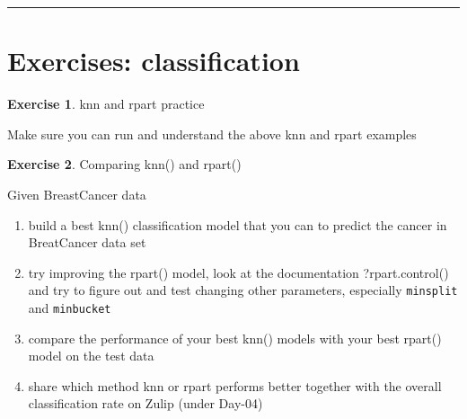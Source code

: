 \documentclass[
]{book}
\newenvironment{Shaded}{\begin{snugshade}}{\end{snugshade}}
\newcommand{\CommentTok}[1]{\textcolor[rgb]{0.56,0.35,0.01}{\textit{#1}}}
\newcommand{\DataTypeTok}[1]{\textcolor[rgb]{0.13,0.29,0.53}{#1}}
\newcommand{\FloatTok}[1]{\textcolor[rgb]{0.00,0.00,0.81}{#1}}
\newcommand{\KeywordTok}[1]{\textcolor[rgb]{0.13,0.29,0.53}{\textbf{#1}}}
\newcommand{\NormalTok}[1]{#1}
\newcommand{\OperatorTok}[1]{\textcolor[rgb]{0.81,0.36,0.00}{\textbf{#1}}}
\newcommand{\StringTok}[1]{\textcolor[rgb]{0.31,0.60,0.02}{#1}}
\providecommand{\tightlist}{%
  \setlength{\itemsep}{0pt}\setlength{\parskip}{0pt}}
\theoremstyle{definition}
\theoremstyle{definition}
\theoremstyle{definition}
\newtheorem{exercise}{Exercise}[chapter]
\theoremstyle{remark}
\begin{document}
\begin{Shaded}
\end{Shaded}

\begin{center}\rule{0.5\linewidth}{0.5pt}\end{center}

\hypertarget{exercises-classification}{%
\section{Exercises: classification}\label{exercises-classification}}

\begin{exercise}
\protect\hypertarget{exr:knn-rpart-repeat}{}{\label{exr:knn-rpart-repeat} }knn and rpart practice

Make sure you can run and understand the above knn and rpart examples
\end{exercise}

\begin{exercise}
\protect\hypertarget{exr:knn}{}{\label{exr:knn} }Comparing knn() and rpart()

Given BreastCancer data

\begin{enumerate}
\def\labelenumi{\alph{enumi})}
\tightlist
\item
  build a best knn() classification model that you can to predict the cancer in BreatCancer data set
\item
  try improving the rpart() model, look at the documentation ?rpart.control() and try to figure out and test changing other parameters, especially \texttt{minsplit} and \texttt{minbucket}
\item
  compare the performance of your best knn() models with your best rpart() model on the test data
\item
  share which method knn or rpart performs better together with the overall classification rate on Zulip (under Day-04)
\end{enumerate}
\end{exercise}
\end{document}
